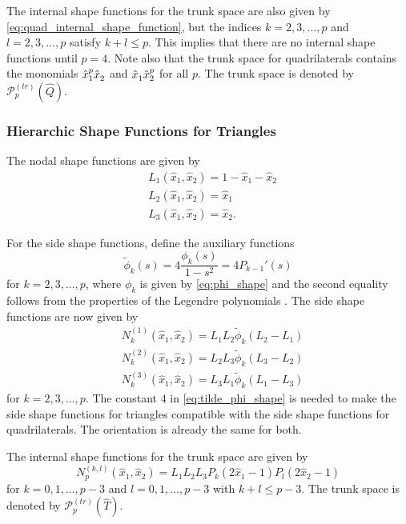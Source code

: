 \documentclass[english, 12pt, a4paper, sci, utf8, a-2b, online]{aaltothesis}
\theoremstyle{definition}
\theoremstyle{plain}
\numberwithin{equation}{section}
\begin{document}
The internal shape functions for the trunk space are also given by
\eqref{eq:quad_internal_shape_function}, but the indices $k=2,3,\dotsc,p$ and
$l=2,3,\dotsc,p$ satisfy $k + l \leq p$. This implies that there are no internal shape
functions until $p=4$. Note also that the trunk space for quadrilaterals
contains the monomials $\hat{x}_1^p \hat{x}_2^{\vphantom{p}}$ and
$\hat{x}_1^{\vphantom{p}} \hat{x}_2^p$ for all $p$.
The trunk space is denoted by $\mathcal{P}_p^{(tr)}(\widehat{Q})$.

\subsubsection{Hierarchic Shape Functions for Triangles}
\label{subsubsec:tri_shape_functions}

The nodal shape functions are given by
\begin{align*}
    &L_1(\hat{x}_1,\hat{x}_2) = 1 - \hat{x}_1 - \hat{x}_2 \\[0.5em]
    &L_2(\hat{x}_1,\hat{x}_2) = \hat{x}_1 \\[0.5em]
    &L_3(\hat{x}_1,\hat{x}_2) = \hat{x}_2.
\end{align*}

For the side shape functions, define the auxiliary functions
\begin{equation}
    \label{eq:tilde_phi_shape}
    \widetilde{\phi}_k(s) = 4 \frac{\phi_k(s)}{1-s^2} = 4 P_{k-1}'(s)
\end{equation}
for $k=2,3,\dotsc,p$, where $\phi_k$ is given by \eqref{eq:phi_shape} and
the second equality follows from the properties of the Legendre polynomials \cite{andrews1998}.
The side shape functions are now given by
\begin{align*}
    &N_k^{(1)}(\hat{x}_1,\hat{x}_2) = L_1 L_2 \widetilde{\phi}_k(L_2 - L_1) \\[0.5em]
    &N_k^{(2)}(\hat{x}_1,\hat{x}_2) = L_2 L_3 \widetilde{\phi}_k(L_3 - L_2) \\[0.5em]
    &N_k^{(3)}(\hat{x}_1,\hat{x}_2) = L_3 L_1 \widetilde{\phi}_k(L_1 - L_3)
\end{align*}
for $k=2,3,\dotsc,p$. The constant $4$ in \eqref{eq:tilde_phi_shape} is needed
to make the side shape functions for triangles compatible with
the side shape functions for quadrilaterals.
The orientation is already the same for both.

The internal shape functions for the trunk space are given by
\begin{equation}
    \label{eq:tri_internal_shape_function}
    N_p^{(k,l)}(\hat{x}_1,\hat{x}_2) = L_1 L_2 L_3 P_k(2\hat{x}_1 - 1) P_l(2\hat{x}_2 - 1)
\end{equation}
for $k=0,1,\dotsc,p-3$ and $l=0,1,\dotsc,p-3$ with $k+l \leq p-3$.
The trunk space is denoted by $\mathcal{P}_p^{(tr)}(\widehat{T})$.
\end{document}
